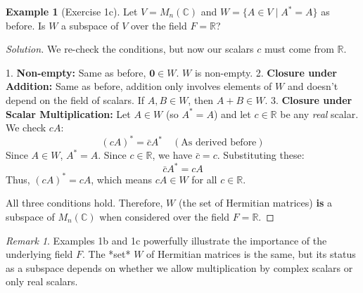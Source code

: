 \documentclass[11pt]{article}
\theoremstyle{definition}
\newtheorem{example}[theorem]{Example}
\theoremstyle{remark}
\newtheorem{remark}[theorem]{Remark}
\newcommand{\zerovec}{\mathbf{0}}
\begin{document}
\begin{example}[Exercise 1c]
Let $V = M_n(\mathbb{C})$ and $W = \{ A \in V \mid A^* = A \}$ as before. Is $W$ a subspace of $V$ over the field $F=\mathbb{R}$?

\begin{proof}[Solution]
We re-check the conditions, but now our scalars $c$ must come from $\mathbb{R}$.

1.  \textbf{Non-empty:} Same as before, $\zerovec \in W$. $W$ is non-empty.
2.  \textbf{Closure under Addition:} Same as before, addition only involves elements of $W$ and doesn't depend on the field of scalars. If $A, B \in W$, then $A+B \in W$.
3.  \textbf{Closure under Scalar Multiplication:} Let $A \in W$ (so $A^* = A$) and let $c \in \mathbb{R}$ be any \emph{real} scalar. We check $cA$:
    \[ (cA)^* = \bar{c} A^* \quad (\text{As derived before}) \]
    Since $A \in W$, $A^*=A$. Since $c \in \mathbb{R}$, we have $\bar{c} = c$. Substituting these:
    \[ \bar{c} A^* = c A \]
    Thus, $(cA)^* = cA$, which means $cA \in W$ for all $c \in \mathbb{R}$.

All three conditions hold. Therefore, $W$ (the set of Hermitian matrices) \textbf{is} a subspace of $M_n(\mathbb{C})$ when considered over the field $F=\mathbb{R}$.
\end{proof}
\end{example}

\begin{remark}
Examples 1b and 1c powerfully illustrate the importance of the underlying field $F$. The *set* $W$ of Hermitian matrices is the same, but its status as a subspace depends on whether we allow multiplication by complex scalars or only real scalars.
\end{remark}
\end{document}
